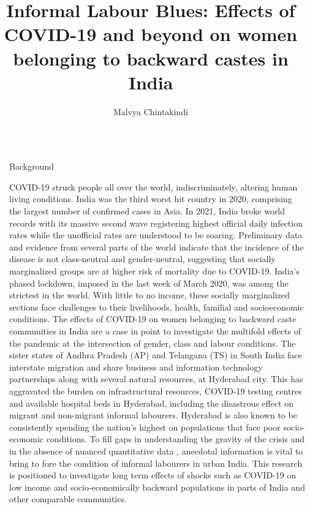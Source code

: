 \documentclass[final]{beamer}
\title{Informal Labour Blues: Effects of COVID-19 and beyond on women belonging to backward castes in India}
\author{Malvya Chintakindi\inst{1} \inst{*}}
\institute[shortinst]{\inst{1} PhD Student \samelineand \inst{*} Advised by: Prof. Lamia Karim}
\newlength{\sepwidth}
\newlength{\colwidth}
\newcommand{\separatorcolumn}{\begin{column}{\sepwidth}\end{column}}
\begin{document}
\begin{frame}[t]
\begin{columns}[t]
\separatorcolumn

\begin{column}{\colwidth}

  \begin{block}{Background}

COVID-19 struck people all over the world, indiscriminately,
altering human living conditions. India was the third worst hit
country in 2020, comprising the largest number of confirmed
cases in Asia. In 2021, India broke world records with its
massive second wave registering highest official daily
infection rates while the unofficial rates are understood to be
soaring. Preliminary data and evidence from several parts of
the world indicate that the incidence of the disease is not
class-neutral and gender-neutral, suggesting that socially
marginalized groups are at higher risk of mortality due to
COVID-19. India’s phased lockdown, imposed in the last week
of March 2020, was among the strictest in the world. With
little to no income, these socially marginalized sections face
challenges to their livelihoods, health, familial and socioeconomic
conditions. The effects of COVID-19 on women
belonging to backward caste communities in India are a case
in point to investigate the multifold effects of the pandemic at
the intersection of gender, class and labour conditions. The
sister states of Andhra Pradesh (AP) and Telangana (TS) in
South India face interstate migration and share business and
information technology partnerships along with several
natural resources, at Hyderabad city. This has aggravated the
burden on infrastructural resources, COVID-19 testing centres
and available hospital beds in Hyderabad, including the
disastrous effect on migrant and non-migrant informal
labourers. Hyderabad is also known to be consistently
spending the nation’s highest on populations that face poor
socio-economic conditions. To fill gaps in understanding the
gravity of the crisis and in the absence of nuanced quantitative
data , anecdotal information is vital to bring to fore the
condition of informal labourers in urban India. This research is
positioned to investigate long term effects of shocks such as
COVID-19 on low income and socio-economically backward
populations in parts of India and other comparable
communities.

\vspace{2cm}


\end{block}
\end{column}
\end{columns}
\end{frame}
\end{document}

